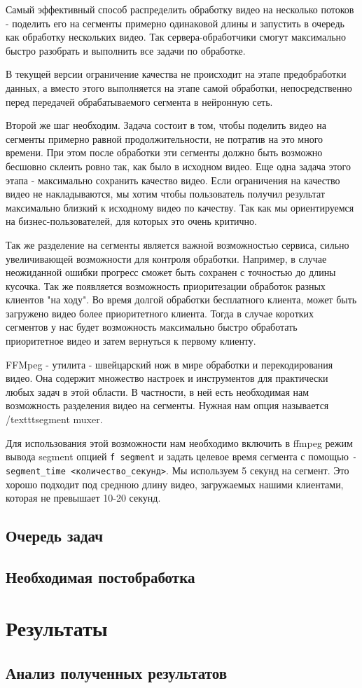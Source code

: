 Самый эффективный способ распределить обработку видео на несколько потоков - поделить его на сегменты примерно одинаковой длины и запустить в очередь как обработку нескольких видео. Так сервера-обработчики смогут максимально быстро разобрать и выполнить все задачи по обработке.

В текущей версии ограничение качества не происходит на этапе предобработки данных, а вместо этого выполняется на этапе самой обработки, непосредственно перед передачей обрабатываемого сегмента в нейронную сеть.

Второй же шаг необходим. Задача состоит в том, чтобы поделить видео на сегменты примерно равной продолжительности, не потратив на это много времени. При этом после обработки эти сегменты должно быть возможно бесшовно склеить ровно так, как было в исходном видео. Еще одна задача этого этапа - максимально сохранить качество видео. Если ограничения на качество видео не накладываются, мы хотим чтобы пользователь получил результат максимально близкий к исходному видео по качеству. Так как мы ориентируемся на бизнес-пользователей, для которых это очень критично.

Так же разделение на сегменты является важной возможностью сервиса, сильно увеличивающей возможности для контроля обработки. Например, в случае неожиданной ошибки прогресс сможет быть сохранен с точностью до длины кусочка. Так же появляется возможность приоритезации обработок разных клиентов "на ходу". Во время долгой обработки бесплатного клиента, может быть загружено видео более приоритетного клиента. Тогда в случае коротких сегментов у нас будет возможность максимально быстро обработать приоритетное видео и затем вернуться к первому клиенту.

FFMpeg - утилита - швейцарский нож в мире обработки и перекодирования видео. Она содержит множество настроек и инструментов для практически любых задач в этой области. В частности, в ней есть необходимая нам возможность разделения видео на сегменты. Нужная нам опция называется /texttt{segment muxer}.

Для использования этой возможности нам необходимо включить в ffmpeg режим вывода segment опцией \texttt{\-f segment} и задать целевое время сегмента с помощью \texttt{-segment\_time <количество\_секунд>}. Мы используем 5 секунд на сегмент. Это хорошо подходит под среднюю длину видео, загружаемых нашими клиентами, которая не превышает 10-20 секунд.

\subsection{Очередь задач}

\subsection{Необходимая постобработка}

\section{Результаты}

\subsection{Анализ полученных результатов}

